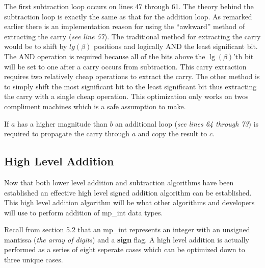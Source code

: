 \documentclass[b5paper]{book}
\begin{document}
The first subtraction loop occurs on lines 47 through 61.  The theory behind the subtraction loop is exactly the same as that for
the addition loop.  As remarked earlier there is an implementation reason for using the ``awkward'' method of extracting the carry 
(\textit{see line 57}).  The traditional method for extracting the carry would be to shift by $lg(\beta)$ positions and logically AND 
the least significant bit.  The AND operation is required because all of the bits above the $\lg(\beta)$'th bit will be set to one after a carry
occurs from subtraction.  This carry extraction requires two relatively cheap operations to extract the carry.  The other method is to simply 
shift the most significant bit to the least significant bit thus extracting the carry with a single cheap operation.  This optimization only works on
twos compliment machines which is a safe assumption to make.

If $a$ has a higher magnitude than $b$ an additional loop (\textit{see lines 64 through 73}) is required to propagate the carry through
$a$ and copy the result to $c$.  

\subsection{High Level Addition}
Now that both lower level addition and subtraction algorithms have been established an effective high level signed addition algorithm can be
established.  This high level addition algorithm will be what other algorithms and developers will use to perform addition of mp\_int data 
types.  

Recall from section 5.2 that an mp\_int represents an integer with an unsigned mantissa (\textit{the array of digits}) and a \textbf{sign} 
flag.  A high level addition is actually performed as a series of eight seperate cases which can be optimized down to three unique cases.
\end{document}
